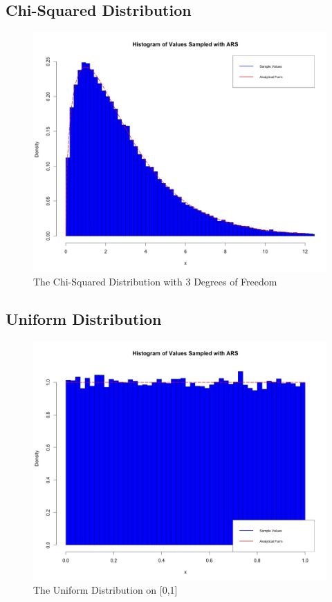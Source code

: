\documentclass[12pt, oneside]{article}
\begin{document}
\subsection{Chi-Squared Distribution}

\begin{figure}[H]
\centering
  \includegraphics[scale=.25]{figure/chi_squared_dof3.jpeg}
  \caption{The Chi-Squared Distribution with 3 Degrees of Freedom}
  \label{fig:d2}
\end{figure}

\subsection{Uniform Distribution}

\begin{figure}[H]
\centering
  \includegraphics[scale=.25]{figure/uniform.jpeg}
  \caption{The Uniform Distribution on [0,1]}
  \label{fig:d3}
\end{figure}
\end{document}
